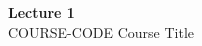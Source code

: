 \documentclass[12pt]{article}
\begin{document}
\begin{center}
  {\LARGE\bfseries Lecture 1}\\[0.25em]
  {\large COURSE-CODE Course Title}\\[0.15em]
\end{center}

\end{document}
